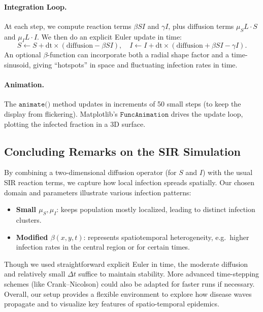 \paragraph{Integration Loop.}
At each step, we compute reaction terms \(\beta SI\) and \(\gamma I\), plus diffusion terms \(\mu_S L\cdot S\) and \(\mu_I L\cdot I\). We then do an explicit Euler update in time:
\[
  S \gets S + \mathrm{dt}\times(\text{diffusion} - \beta S I),\quad
  I \gets I + \mathrm{dt}\times(\text{diffusion} + \beta S I - \gamma I).
\]
An optional \(\beta\)-function can incorporate both a radial shape factor and a time-sinusoid, giving “hotspots” in space and fluctuating infection rates in time.

\paragraph{Animation.}
The \(\texttt{animate()}\) method updates in increments of 50 small steps (to keep the display from flickering). Matplotlib’s \(\texttt{FuncAnimation}\) drives the update loop, plotting the infected fraction in a 3D surface.

\subsection{Concluding Remarks on the SIR Simulation}

By combining a two-dimensional diffusion operator (for $S$ and $I$) with the usual SIR reaction terms, we capture how local infection spreads spatially. Our chosen domain and parameters illustrate various infection patterns:
\begin{itemize}
  \item \textbf{Small \(\mu_S,\mu_I\)}: keeps population mostly localized, leading to distinct infection clusters.
  \item \textbf{Modified \(\beta(x,y,t)\)}: represents spatiotemporal heterogeneity, e.g.\ higher infection rates in the central region or for certain times.
\end{itemize}
Though we used straightforward explicit Euler in time, the moderate diffusion and relatively small \(\Delta t\) suffice to maintain stability. More advanced time-stepping schemes (like Crank--Nicolson) could also be adapted for faster runs if necessary. Overall, our setup provides a flexible environment to explore how disease waves propagate and to visualize key features of spatio-temporal epidemics.
